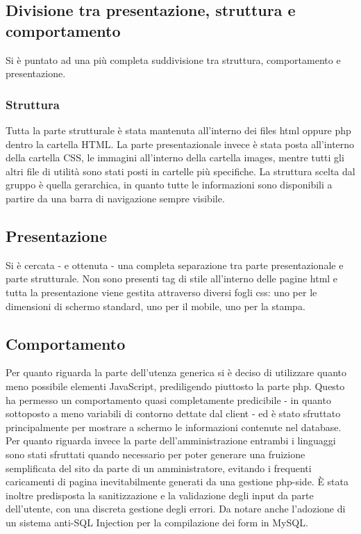 \subsection{Divisione tra presentazione, struttura e comportamento}
Si è puntato ad una più completa suddivisione tra struttura, comportamento e presentazione.
\subsubsection{Struttura}
Tutta la parte strutturale è stata mantenuta all'interno dei files html oppure php dentro la cartella HTML. La parte presentazionale invece è stata posta all'interno della cartella CSS, le immagini all'interno della cartella images, mentre tutti gli altri file di utilità sono stati posti in cartelle più specifiche. La struttura scelta dal gruppo è quella gerarchica, in quanto tutte le informazioni sono disponibili a partire da una barra di navigazione sempre visibile.
\subsection{Presentazione}
Si è cercata - e ottenuta - una completa separazione tra parte presentazionale e parte strutturale. Non sono presenti tag di stile all'interno delle pagine html e tutta la presentazione viene gestita attraverso diversi fogli css: uno per le dimensioni di schermo standard, uno per il mobile, uno per la stampa.
\subsection{Comportamento}
Per quanto riguarda la parte dell'utenza generica si è deciso di utilizzare quanto meno possibile elementi JavaScript, prediligendo piuttosto la parte php. Questo ha permesso un comportamento quasi completamente predicibile - in quanto sottoposto a meno variabili di contorno dettate dal client - ed è stato sfruttato principalmente per mostrare a schermo le informazioni contenute nel database.
\\Per quanto riguarda invece la parte dell'amministrazione entrambi i linguaggi sono stati sfruttati quando necessario per poter generare una fruizione semplificata del sito da parte di un amministratore, evitando i frequenti caricamenti di pagina inevitabilmente generati da una gestione php-side. È stata inoltre predisposta la sanitizzazione e la validazione degli input da parte dell'utente, con una discreta gestione degli errori. Da notare anche l'adozione di un sistema anti-SQL Injection per la compilazione dei form in MySQL.
